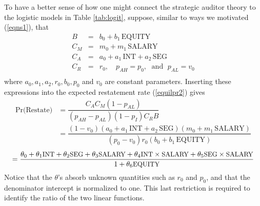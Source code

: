 To have a better sense of how one might connect the strategic auditor theory to the
logistic models in Table \ref{tab:logit}, suppose, similar to ways we motivated (\ref{eqns1}), that 
\begin{equation}\begin{array}{lcl}\label{eqns2}
B & = & b_0 + b_1 \, \mbox{EQUITY} \\[.5em]
C_M & = & m_0 + m_1 \, \mbox{SALARY} \\[.5em]
C_A & = & a_0 + a_1 \, \mbox{INT} + a_2 \, \mbox{SEG}\\[.5em]
C_R & = & r_0, \quad p_{AH}   =  p_0, \; \mbox{ and } \; p_{AL}  =  v_0 \\[.5em]
\end{array}
\end{equation}
where $ a_0, a_1, a_2, r_0, b_0, p_0$ and $v_0$ are constant parameters. 
Inserting these expressions into the expected restatement rate (\ref{equilpr2}) gives
\begin{align*} \label{equilpr3}
\mbox{Pr(Restate)} & =   \dfrac{C_AC_M(1-p_{AL})}{(p_{AH}-p_{AL})(1-p_I)C_RB} \\
&= \dfrac{(1-v_0)(a_0 + a_1 \, \mbox{INT} + a_2 \, \mbox{SEG})(m_0 + m_1 \, \mbox{SALARY})}
{(p_0-v_0)r_0(b_0 + b_1 \, \mbox{EQUITY})}
\end{align*}
\begin{equation}\label{equilpr4}
 =  \dfrac{\theta_0 + \theta_1\mbox{\small INT} + \theta_2\mbox{\small SEG} + \theta_3\mbox{\small SALARY}
+ \theta_4\mbox{\small INT} \times \mbox{\small SALARY}+ \theta_5\mbox{\small SEG} \times \mbox{\small SALARY}}
{1 +  \theta_6\mbox{\small EQUITY}}
\end{equation}
Notice that the $\theta$'s absorb unknown quantities such as $r_0$ and $p_0$, and that the denominator intercept
is normalized to one. This last restriction is required to identify the ratio of the two linear functions.

